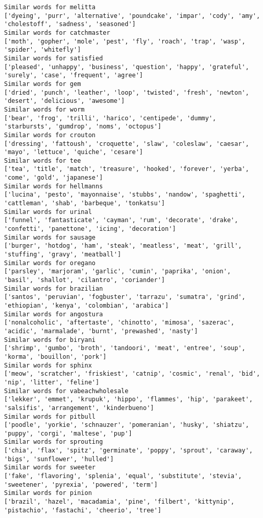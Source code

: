 \documentclass[11pt]{article}
\begin{document}
\begin{Verbatim}[commandchars=\\\{\}]
Similar words for melitta
['dyeing', 'purr', 'alternative', 'poundcake', 'impar', 'cody', 'amy', 'cholestoff', 'sadness', 'seasoned']
Similar words for catchmaster
['moth', 'gopher', 'mole', 'pest', 'fly', 'roach', 'trap', 'wasp', 'spider', 'whitefly']
Similar words for satisfied
['pleased', 'unhappy', 'business', 'question', 'happy', 'grateful', 'surely', 'case', 'frequent', 'agree']
Similar words for gem
['dried', 'punch', 'leather', 'loop', 'twisted', 'fresh', 'newton', 'desert', 'delicious', 'awesome']
Similar words for worm
['bear', 'frog', 'trilli', 'harico', 'centipede', 'dummy', 'starbursts', 'gumdrop', 'noms', 'octopus']
Similar words for crouton
['dressing', 'fattoush', 'croquette', 'slaw', 'coleslaw', 'caesar', 'mayo', 'lettuce', 'quiche', 'cesare']
Similar words for tee
['tea', 'title', 'match', 'treasure', 'hooked', 'forever', 'yerba', 'come', 'gold', 'japanese']
Similar words for hellmanns
['lucina', 'pesto', 'mayonnaise', 'stubbs', 'nandow', 'spaghetti', 'cattleman', 'shab', 'barbeque', 'tonkatsu']
Similar words for urinal
['funnel', 'fantasticate', 'cayman', 'rum', 'decorate', 'drake', 'confetti', 'panettone', 'icing', 'decoration']
Similar words for sausage
['burger', 'hotdog', 'ham', 'steak', 'meatless', 'meat', 'grill', 'stuffing', 'gravy', 'meatball']
Similar words for oregano
['parsley', 'marjoram', 'garlic', 'cumin', 'paprika', 'onion', 'basil', 'shallot', 'cilantro', 'coriander']
Similar words for brazilian
['santos', 'peruvian', 'fogbuster', 'tarrazu', 'sumatra', 'grind', 'ethiopian', 'kenya', 'colombian', 'arabica']
Similar words for angostura
['nonalcoholic', 'aftertaste', 'chinotto', 'mimosa', 'sazerac', 'acidic', 'marmalade', 'burnt', 'prewashed', 'nasty']
Similar words for biryani
['shrimp', 'gumbo', 'broth', 'tandoori', 'meat', 'entree', 'soup', 'korma', 'bouillon', 'pork']
Similar words for sphinx
['meow', 'scratcher', 'friskiest', 'catnip', 'cosmic', 'renal', 'bid', 'nip', 'litter', 'feline']
Similar words for vabeachwholesale
['lekker', 'emmet', 'krupuk', 'hippo', 'flammes', 'hip', 'parakeet', 'salsifis', 'arrangement', 'kinderbueno']
Similar words for pitbull
['poodle', 'yorkie', 'schnauzer', 'pomeranian', 'husky', 'shiatzu', 'puppy', 'corgi', 'maltese', 'pup']
Similar words for sprouting
['chia', 'flax', 'spitz', 'germinate', 'poppy', 'sprout', 'caraway', 'bigs', 'sunflower', 'hulled']
Similar words for sweeter
['fake', 'flavoring', 'splenia', 'equal', 'substitute', 'stevia', 'sweetener', 'pyrexia', 'powered', 'term']
Similar words for pinion
['brazil', 'hazel', 'macadamia', 'pine', 'filbert', 'kittynip', 'pistachio', 'fastachi', 'cheerio', 'tree']

\end{Verbatim}
\end{document}
